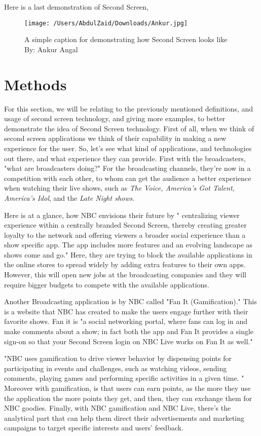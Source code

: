 \documentclass[12pt, oneside]{amsart}   	%
\begin{document}
Here is a last demonstration of Second Screen,
\begin{figure}[ht!]
\centering
\texttt{[image: /Users/AbdulZaid/Downloads/Ankur.jpg]}
\caption{A simple caption for demonstrating how Second Screen looks like By: Ankur Angal}
\label{overflow}
\end{figure}

\section{Methods} 
For this section, we will be relating to the previously mentioned definitions, and usage of second screen technology, and giving more examples, to better demonstrate the idea of Second Screen technology. First of all, when we think of second screen applications we think of their capability in making a new experience for the user.  So, let's see what kind of applications, and technologies out there, and what experience they can provide.  First with the broadcasters, "what are broadcasters doing?" \cite{Second-Screen-Art}  For the broadcasting channels, they're now in a competition with each other, to whom can get the audience a better experience when watching their live shows, such as \emph{The Voice, America's Got Talent, America's Idol}, and the \emph{Late Night shows.}

Here is at a glance, how NBC envisions their future by " centralizing viewer experience within a centrally branded Second Screen, thereby creating greater loyalty to the network and offering viewers a broader social experience than a show specific app.  The app includes more features and an evolving landscape as shows come and go." \cite{Second-Screen-Art}  Here, they are trying to block the available applications in the online stores to spread widely by adding extra features to their own apps.  However, this will open new jobs at the broadcasting companies and they will require bigger budgets to compete with the available applications.

Another Broadcasting application is by NBC called "Fan It (Gamification)." This is a website that NBC has created to make the users engage further with their favorite shows.  Fan it is "a social networking portal, where fans can log in and make comments about a show; in fact both the app and Fan It provides a single sign-on so that your Second Screen login on NBC Live works on Fan It as well." \cite{Second-Screen-Art}

"NBC uses gamification to drive viewer behavior by dispensing points for participating in events and 
challenges, such as watching videos, sending comments, playing games and performing specific 
activities in a given time. "\cite{Second-Screen-Art}  Moreover with gamification, is that users can earn points, as the more they use the application the more points they get, and then, they can exchange them for NBC goodies.  Finally, with NBC gamification and NBC Live, there's the analytical part that can help them direct their advertisements and marketing campaigns to target specific interests and 
users' feedback.
\end{document}
